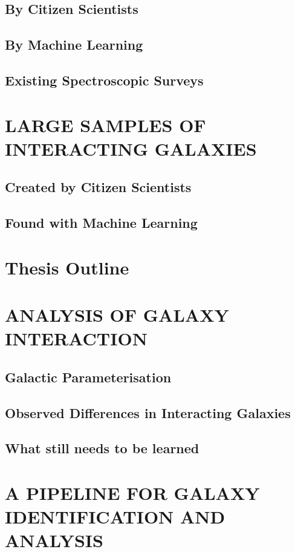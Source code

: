 \subsection{By Citizen Scientists}

\subsection{By Machine Learning}

\subsection{Existing Spectroscopic Surveys}


\section{LARGE SAMPLES OF INTERACTING GALAXIES}
\subsection{Created by Citizen Scientists}
\subsection{Found with Machine Learning}
\section{Thesis Outline}

\section{ANALYSIS OF GALAXY INTERACTION}
\subsection{Galactic Parameterisation}
\subsection{Observed Differences in Interacting Galaxies}
\subsection{What still needs to be learned}

\section{A PIPELINE FOR GALAXY IDENTIFICATION AND ANALYSIS}